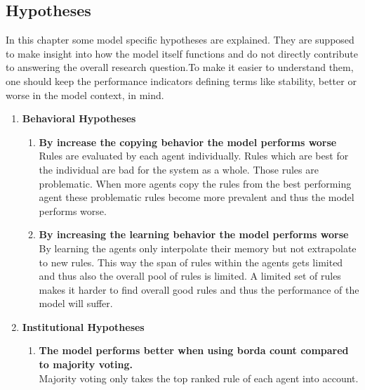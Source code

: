 \documentclass[a4paper]{article}
\begin{document}
\subsection{Hypotheses}
In this chapter some model specific hypotheses are explained. They are supposed to make insight into how the model itself 
functions  and do not directly contribute to answering the overall research question.To make it easier to understand 
them, one should keep the performance indicators defining terms like  stability, better or worse in the model context, in mind.\\ 
\begin{enumerate}
 \item \textbf{Behavioral Hypotheses} \begin{enumerate}
                                       \item \textbf{By increase the copying behavior the model performs worse}\\
                                       Rules are evaluated by each agent individually. Rules which are best for the 
                                       individual are bad for the system as a whole. Those rules are problematic.
                                       When more agents copy the rules from the best performing agent these problematic 
                                       rules become more prevalent and thus the model performs worse.
                                       \item \textbf{By increasing the learning behavior the model performs worse} \\
                                       By learning the agents only interpolate their memory but not extrapolate to new rules.
                                       This way the span of rules within the agents gets limited and thus also the overall 
                                       pool of rules is limited. A limited set of rules makes it harder to find overall 
                                       good rules and thus the performance of the model will suffer. 
                                      \end{enumerate}
 \item \textbf{Institutional Hypotheses} \begin{enumerate}
					  \item \textbf{The model performs better when using borda count compared to 
					  majority voting.}\\
					   Majority voting only takes the top ranked rule of each agent into account. 

\end{enumerate}
\end{enumerate}
\end{document}
